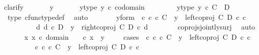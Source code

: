\begin{isabellebody}
{\isacharparenleft}{\kern0pt}clarify{\isacharparenright}{\kern0pt}\ \isanewline
\ \ \ \ \isamarkupfalse%
\ y\ \isanewline
\ \ \ \ \isamarkupfalse%
\ y{\isacharunderscore}{\kern0pt}type{\isacharcolon}{\kern0pt}\ {\isachardoublequoteopen}y\ {\isasymin}\isactrlsub c\ codomain\ {\isasymphi}{\isachardoublequoteclose}\isanewline
\ \ \ \ \isamarkupfalse%
\ \isamarkupfalse%
\ y{\isacharunderscore}{\kern0pt}type{}{\isacharcolon}{\kern0pt}\ {\isachardoublequoteopen}y\ {\isasymin}\isactrlsub c\ C\ {\isasymCoprod}\ D{\isachardoublequoteclose}\isanewline
\ \ \ \ \ \ \isamarkupfalse%
\ {\isasymphi}{\isacharunderscore}{\kern0pt}type\ cfunc{\isacharunderscore}{\kern0pt}type{\isacharunderscore}{\kern0pt}def\ \isamarkupfalse%
\ auto\isanewline
\ \ \ \ \isamarkupfalse%
\ \isamarkupfalse%
\ y{\isacharunderscore}{\kern0pt}form{\isacharcolon}{\kern0pt}\ {\isachardoublequoteopen}{\isacharparenleft}{\kern0pt}{\isasymexists}\ c{\isachardot}{\kern0pt}\ c\ {\isasymin}\isactrlsub c\ C\ {\isasymand}\ y\ {\isacharequal}{\kern0pt}\ left{\isacharunderscore}{\kern0pt}coproj\ C\ D\ {\isasymcirc}\isactrlsub c\ c{\isacharparenright}{\kern0pt}\isanewline
\ \ \ \ \ \ {\isasymor}\ \ {\isacharparenleft}{\kern0pt}{\isasymexists}\ d{\isachardot}{\kern0pt}\ d\ {\isasymin}\isactrlsub c\ D\ {\isasymand}\ y\ {\isacharequal}{\kern0pt}\ right{\isacharunderscore}{\kern0pt}coproj\ C\ D\ {\isasymcirc}\isactrlsub c\ d{\isacharparenright}{\kern0pt}{\isachardoublequoteclose}\isanewline
\ \ \ \ \ \ \isamarkupfalse%
\ coprojs{\isacharunderscore}{\kern0pt}jointly{\isacharunderscore}{\kern0pt}surj\ \isamarkupfalse%
\ auto\isanewline
\ \ \ \ \isamarkupfalse%
\ {\isachardoublequoteopen}{\isasymexists}x{\isachardot}{\kern0pt}\ x\ {\isasymin}\isactrlsub c\ domain\ {\isasymphi}\ {\isasymand}\ {\isasymphi}\ {\isasymcirc}\isactrlsub c\ x\ {\isacharequal}{\kern0pt}\ y{\isachardoublequoteclose}\isanewline
\ \ \ \ \isamarkupfalse%
{\isacharparenleft}{\kern0pt}cases\ {\isachardoublequoteopen}{\isasymexists}\ c{\isachardot}{\kern0pt}\ c\ {\isasymin}\isactrlsub c\ C\ {\isasymand}\ y\ {\isacharequal}{\kern0pt}\ left{\isacharunderscore}{\kern0pt}coproj\ C\ D\ {\isasymcirc}\isactrlsub c\ c{\isachardoublequoteclose}{\isacharparenright}{\kern0pt}\isanewline
\ \ \ \ \ \ \isamarkupfalse%
\ {\isachardoublequoteopen}{\isasymexists}\ c{\isachardot}{\kern0pt}\ c\ {\isasymin}\isactrlsub c\ C\ {\isasymand}\ y\ {\isacharequal}{\kern0pt}\ left{\isacharunderscore}{\kern0pt}coproj\ C\ D\ {\isasymcirc}\isactrlsub c\ c{\isachardoublequoteclose}\isanewline

\end{isabellebody}
